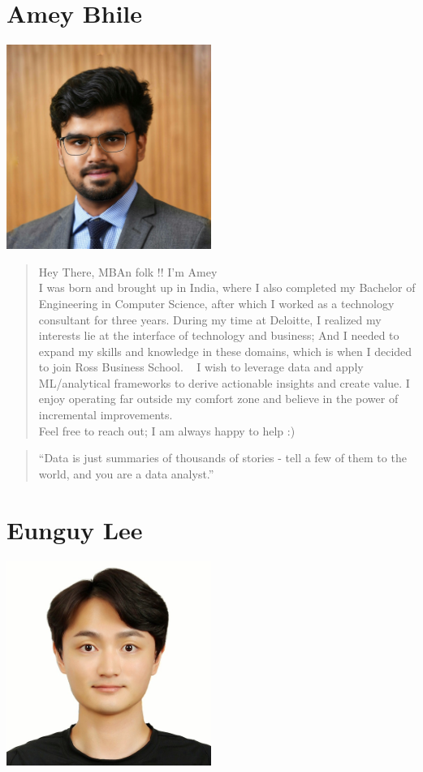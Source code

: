 \documentclass[
]{book}
\begin{document}
\hypertarget{amey-bhile-1}{%
\section*{Amey Bhile}\label{amey-bhile-1}}

\includegraphics[width=0.5\textwidth,height=\textheight]{Images/Amey.jpeg}

\begin{quote}
Hey There, MBAn folk !! I'm Amey\\
I was born and brought up in India, where I also completed my Bachelor of Engineering in Computer Science, after which I worked as a technology consultant for three years. During my time at Deloitte, I realized my interests lie at the interface of technology and business; And I needed to expand my skills and knowledge in these domains, which is when I decided to join Ross Business School. ~
I wish to leverage data and apply ML/analytical frameworks to derive actionable insights and create value. I enjoy operating far outside my comfort zone and believe in the power of incremental improvements.\\
Feel free to reach out; I am always happy to help :)
\end{quote}

\begin{quote}
``Data is just summaries of thousands of stories - tell a few of them to the world, and you are a data analyst.''
\end{quote}

\hypertarget{eunguy-lee-1}{%
\section*{Eunguy Lee}\label{eunguy-lee-1}}

\includegraphics[width=0.5\textwidth,height=\textheight]{Images/Eunguy.jpg}
\end{document}
